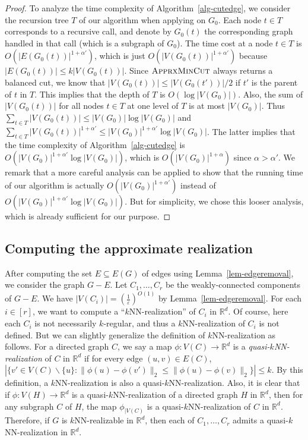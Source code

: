 \documentclass[english]{lipics-v2021}
\begin{document}
\begin{proof}
To analyze the time complexity of Algorithm~\ref{alg-cutedge}, we consider the recursion tree $T$ of our algorithm when applying on $G_0$.
Each node $t \in T$ corresponds to a recursive call, and denote by $G_0(t)$ the corresponding graph handled in that call (which is a subgraph of $G_0$).
The time cost at a node $t \in T$ is $O(|E(G_0(t))|^{1+\alpha'})$, which is just $O(|V(G_0(t))|^{1+\alpha'})$ because $|E(G_0(t))| \leq k|V(G_0(t))|$.
Since $\textsc{ApprxMinCut}$ always returns a balanced cut, we know that $|V(G_0(t))| \leq |V(G_0(t'))|/2$ if $t'$ is the parent of $t$ in $T$.
This implies that the depth of $T$ is $O(\log |V(G_0)|)$.
Also, the sum of $|V(G_0(t))|$ for all nodes $t \in T$ at one level of $T$ is at most $|V(G_0)|$.
Thus $\sum_{t \in T} |V(G_0(t))| \leq |V(G_0)| \log |V(G_0)|$ and $\sum_{t \in T} |V(G_0(t))|^{1+\alpha'} \leq |V(G_0)|^{1+\alpha'} \log |V(G_0)|$.
The latter implies that the time complexity of Algorithm~\ref{alg-cutedge} is $O(|V(G_0)|^{1+\alpha'} \log |V(G_0)|)$, which is $O(|V(G_0)|^{1+\alpha})$ since $\alpha > \alpha'$.
We remark that a more careful analysis can be applied to show that the running time of our algorithm is actually $O(|V(G_0)|^{1+\alpha'})$ instead of $O(|V(G_0)|^{1+\alpha'} \log |V(G_0)|)$.
But for simplicity, we chose this looser analysis, which is already sufficient for our purpose.
\end{proof}

\subsection{Computing the approximate realization} \label{sec-component}

After computing the set $E \subseteq E(G)$ of edges using Lemma~\ref{lem-edgeremoval}, we consider the graph $G - E$.
Let $C_1,\dots,C_r$ be the weakly-connected components of $G - E$.
We have $|V(C_i)| = (\frac{1}{\varepsilon})^{O(1)}$ by Lemma~\ref{lem-edgeremoval}.
For each $i \in [r]$, we want to compute a ``$k$NN-realization'' of $C_i$ in $\mathbb{R}^d$.
Of course, here each $C_i$ is not necessarily $k$-regular, and thus a $k$NN-realization of $C_i$ is not defined.
But we can slightly generalize the definition of $k$NN-realization as follows.
For a directed graph $C$, we say a map $\phi: V(C) \rightarrow \mathbb{R}^d$ is a \textit{quasi-$k$NN-realization} of $C$ in $\mathbb{R}^d$ if for every edge $(u,v) \in E(C)$, $|\{v' \in V(C) \backslash \{u\}: \lVert \phi(u) - \phi(v') \rVert_2 \leq \lVert \phi(u) - \phi(v) \rVert_2\}| \leq k$.
By this definition, a $k$NN-realization is also a quasi-$k$NN-realization.
Also, it is clear that if $\phi:V(H) \rightarrow \mathbb{R}^d$ is a quasi-$k$NN-realization of a directed graph $H$ in $\mathbb{R}^d$, then for any subgraph $C$ of $H$, the map $\phi_{|V(C)}$ is a quasi-$k$NN-realization of $C$ in $\mathbb{R}^d$.
Therefore, if $G$ is $k$NN-realizable in $\mathbb{R}^d$, then each of $C_1,\dots,C_r$ admits a quasi-$k$NN-realization in $\mathbb{R}^d$.
\end{document}
